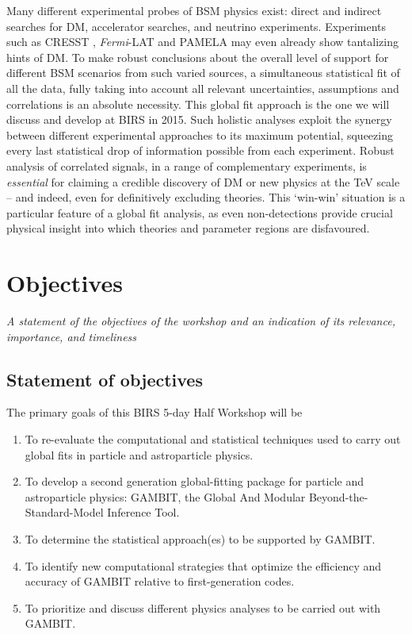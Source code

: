 \documentclass[a4paper,11pt]{article}
\newenvironment{xcomment}{\em}{}
\begin{document}
Many different experimental probes of BSM physics exist: direct and indirect searches for DM, accelerator searches, and neutrino experiments.  Experiments such as CRESST \cite{CRESST11}, \textit{Fermi}-LAT \cite{Bringmann12} and PAMELA \cite{Pamelapositron} may even already show tantalizing hints of DM.  To make robust conclusions about the overall level of support for different BSM scenarios from such varied sources, a simultaneous statistical fit of all the data, fully taking into account all relevant uncertainties, assumptions and correlations is an absolute necessity.  This global fit approach is the one we will discuss and develop at BIRS in 2015.  Such holistic analyses exploit the synergy between different experimental approaches to its maximum potential, squeezing every last statistical drop of information possible from each experiment.  Robust analysis of correlated signals, in a range of complementary experiments, is \textit{essential} for claiming a credible discovery of DM or new physics at the TeV scale -- and indeed, even for definitively excluding theories.  This `win-win' situation is a particular feature of a global fit analysis, as even non-detections provide crucial physical insight into which theories and parameter regions are disfavoured.

\section{Objectives}
\begin{xcomment}
A statement of the objectives of the workshop and an indication of its relevance, importance, and timeliness
\end{xcomment}

\subsection*{Statement of objectives}

The primary goals of this BIRS 5-day Half Workshop will be 
\begin{enumerate}
\item To re-evaluate the computational and statistical techniques used to carry out global fits in particle and astroparticle physics.
\item To develop a second generation global-fitting package for particle and astroparticle physics: GAMBIT, the Global And Modular Beyond-the-Standard-Model Inference Tool.
\item To determine the statistical approach(es) to be supported by GAMBIT.
\item To identify new computational strategies that optimize the efficiency and accuracy of GAMBIT relative to first-generation codes.  
\item To prioritize and discuss different physics analyses to be carried out with GAMBIT.
\end{enumerate}
\end{document}
